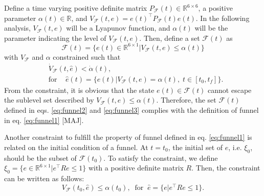 \documentclass[letterpaper, 10 pt, conference]{ieeeconf}  %
\begin{document}
Define a time varying positive definite matrix $P_\mathcal{F}(t) \in \mathbb{R}^{6\times 6}$, a positive parameter $\alpha(t) \in \mathbb{R}$, and $V_\mathcal{F}(t,e) = e(t)^\top P_\mathcal{F}(t) e(t)$.
In the following analysis, $V_\mathcal{F}(t,e)$ will be a Lyapunov function, and $\alpha(t)$ will be the parameter indicating the level of $V_\mathcal{F}(t,e)$.
Then, define a set $\mathcal{F}(t)$ as 
\begin{equation}
\mathcal{F}(t) = \{e(t) \in \mathbb{R}^{6\times 1} | V_\mathcal{F}(t,e) \leq \alpha(t)\} \label{eq:funnel2}
\end{equation}
with $V_\mathcal{F}$ and $\alpha$ constrained such that
\begin{align}
&\dot{V}_\mathcal{F}(t,\hat{e}) < \dot{\alpha}(t), \label{eq:funnel3} \\
&\text{for }\;\;\;\hat{e}(t) = \{e(t)|V_\mathcal{F}(t,e) = \alpha(t),\;t\in[t_0,t_f]\}. \nonumber
\end{align}
From the constraint, it is obvious that the state $e(t) \in \mathcal{F}(t)$ cannot escape the sublevel set described by $V_\mathcal{F}(t,e) \leq \alpha(t)$.
Therefore, the set $\mathcal{F}(t)$ defined in eqs. \eqref{eq:funnel2} and \eqref{eq:funnel3}
 complies with the definition of funnel in eq. \eqref{eq:funnel1} [MAJ]. 

Another constraint to fulfill the property of funnel defined in eq. \eqref{eq:funnel1} is related on the initial condition of a funnel. 
At $t = t_0$, the initial set of $e$, i.e. $\xi_0$, should be the subset of $\mathcal{F}(t_0)$. 
To satisfy the constraint, we define $\xi_0 = \{e \in \mathbb{R}^{6\times1}|e^\top R e \leq 1\}$ with a positive definite matrix $R$. Then, the constraint can be written as follows:
\begin{equation}
V_\mathcal{F}(t_0,\hat{e}) \leq \alpha(t_0),\;\;\text{for}\;\;\hat{e} = \{e |e^\top R e \leq 1\}.
\end{equation} 
\end{document}
